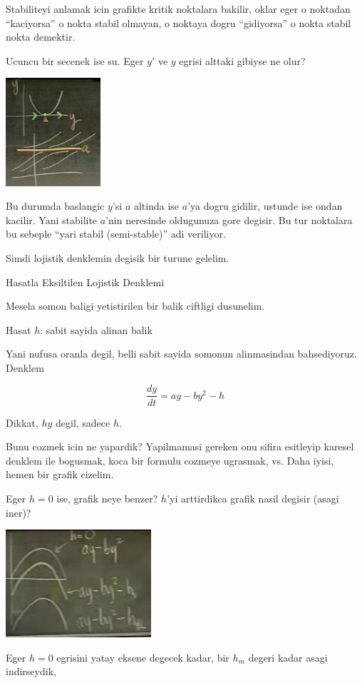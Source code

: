 \documentclass[12pt,fleqn]{article}\usepackage{../common}
\begin{document}
Stabiliteyi anlamak icin grafikte kritik noktalara bakilir, oklar eger o
noktadan ``kaciyorsa'' o nokta stabil olmayan, o noktaya dogru
``gidiyorsa'' o nokta stabil nokta demektir.

Ucuncu bir secenek ise su. Eger $y'$ ve $y$ egrisi alttaki gibiyse ne olur?

\includegraphics[height=4cm]{5_9.png}

Bu durumda baslangic $y$'si $a$ altinda ise $a$'ya dogru gidilir, ustunde
ise ondan kacilir. Yani stabilite $a$'nin neresinde oldugunuza gore
degisir. Bu tur noktalara bu sebeple ``yari stabil (semi-stable)'' adi
veriliyor. 

Simdi lojistik denklemin degisik bir turune gelelim. 

Hasatla Eksiltilen Lojistik Denklemi

Mesela somon baligi yetistirilen bir balik ciftligi dusunelim. 

Hasat $h$: sabit sayida alinan balik

Yani nufusa oranla degil, belli sabit sayida somonun alinmasindan
bahsediyoruz. Denklem

\[ \frac{dy}{dt} = ay - by^2 - h \]

Dikkat, $hy$ degil, sadece $h$. 

Bunu cozmek icin ne yapardik? Yapilmamasi gereken onu sifira esitleyip
karesel denklem ile bogusmak, koca bir formulu cozmeye ugrasmak, vs. Daha
iyisi, hemen bir grafik cizelim. 

Eger $h=0$ ise, grafik neye benzer? $h$'yi arttirdikca grafik nasil degisir
(asagi iner)? 

\includegraphics[height=4cm]{5_10.png}

Eger $h=0$ egrisini yatay eksene degecek kadar, bir $h_m$ degeri kadar
asagi indirseydik, 
\end{document}
